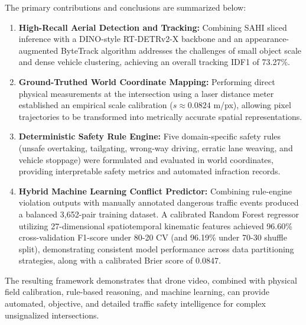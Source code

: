 \documentclass[12pt,a4paper]{report}
\begin{document}
The primary contributions and conclusions are summarized below:
\begin{enumerate}
    \item \textbf{High-Recall Aerial Detection and Tracking:} Combining SAHI sliced inference with a DINO-style RT-DETRv2-X backbone
          and an appearance-augmented ByteTrack algorithm addresses the challenges of small object scale and dense vehicle clustering,
          achieving an overall tracking IDF1 of 73.27\%.
    \item \textbf{Ground-Truthed World Coordinate Mapping:} Performing direct physical measurements at the intersection using a laser distance
          meter established an empirical scale calibration ($s \approx 0.0824$ m/px), allowing pixel trajectories to be transformed into
          metrically accurate spatial representations.
    \item \textbf{Deterministic Safety Rule Engine:} Five domain-specific safety rules (unsafe overtaking, tailgating, wrong-way driving,
          erratic lane weaving, and vehicle stoppage) were formulated and evaluated in world coordinates, providing interpretable safety metrics
          and automated infraction records.
    \item \textbf{Hybrid Machine Learning Conflict Predictor:} Combining rule-engine violation outputs with manually annotated dangerous traffic
          events produced a balanced 3,652-pair training dataset. A calibrated Random Forest regressor utilizing 27-dimensional spatiotemporal
          kinematic features achieved 96.60\% cross-validation F1-score under 80-20 CV (and 96.19\% under 70-30 shuffle split), demonstrating consistent model performance across data partitioning strategies, along with a calibrated Brier score of 0.0847.
\end{enumerate}

The resulting framework demonstrates that drone video, combined with physical field calibration, rule-based reasoning, and machine learning,
can provide automated, objective, and detailed traffic safety intelligence for complex unsignalized intersections.
\clearpage\thispagestyle{empty}\newpage



\end{document}
